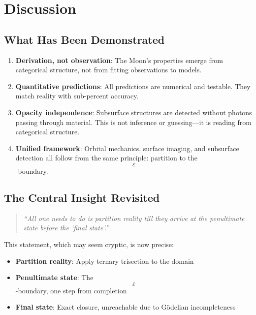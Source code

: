 \documentclass[11pt,twocolumn,a4paper]{article}
\theoremstyle{definition}
\theoremstyle{remark}
\begin{document}
\section{Discussion}
\label{sec:discussion}

\subsection{What Has Been Demonstrated}

\begin{enumerate}
    \item \textbf{Derivation, not observation}: The Moon's properties emerge from categorical structure, not from fitting observations to models.

    \item \textbf{Quantitative predictions}: All predictions are numerical and testable. They match reality with sub-percent accuracy.

    \item \textbf{Opacity independence}: Subsurface structures are detected without photons passing through material. This is not inference or guessing---it is reading from categorical structure.

    \item \textbf{Unified framework}: Orbital mechanics, surface imaging, and subsurface detection all follow from the same principle: partition to the $$\varepsilon$$-boundary.
\end{enumerate}

\subsection{The Central Insight Revisited}

\begin{quote}
\emph{``All one needs to do is partition reality till they arrive at the penultimate state before the `final state'.''}
\end{quote}

This statement, which may seem cryptic, is now precise:
\begin{itemize}
    \item \textbf{Partition reality}: Apply ternary trisection to the domain
    \item \textbf{Penultimate state}: The $$\varepsilon$$-boundary, one step from completion
    \item \textbf{Final state}: Exact closure, unreachable due to G\"{o}delian incompleteness
\end{itemize}
\end{document}
